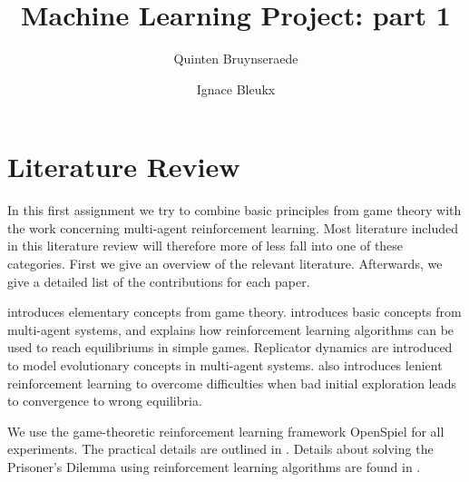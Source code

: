 \documentclass[10pt,a4paper]{article}
\author{Quinten Bruynseraede}
\author{Ignace Bleukx}
\title{Machine Learning Project: part 1}
\begin{document}
\maketitle

\section{Literature Review}
In this first assignment we try to combine basic principles from game theory with the work concerning multi-agent reinforcement learning. Most literature included in this literature review will therefore more of less fall into one of these categories. First we give an overview of the relevant literature. Afterwards, we give a detailed list of the contributions for each paper.

\citet{mas} introduces elementary concepts from game theory. \citet{phdthesis} introduces basic concepts from multi-agent systems, and explains how reinforcement learning algorithms can be used to reach equilibriums in simple games. Replicator dynamics are introduced to model evolutionary concepts in multi-agent systems. \citet{phdthesis} also introduces lenient reinforcement learning to overcome difficulties when bad initial exploration leads to convergence to wrong equilibria.

We use the game-theoretic reinforcement learning framework OpenSpiel for all experiments. The practical details are outlined in \citet{lanctot2019openspiel}. Details about solving the Prisoner's Dilemma using reinforcement learning algorithms are found in \citet{rlforpd}.
\end{document}
